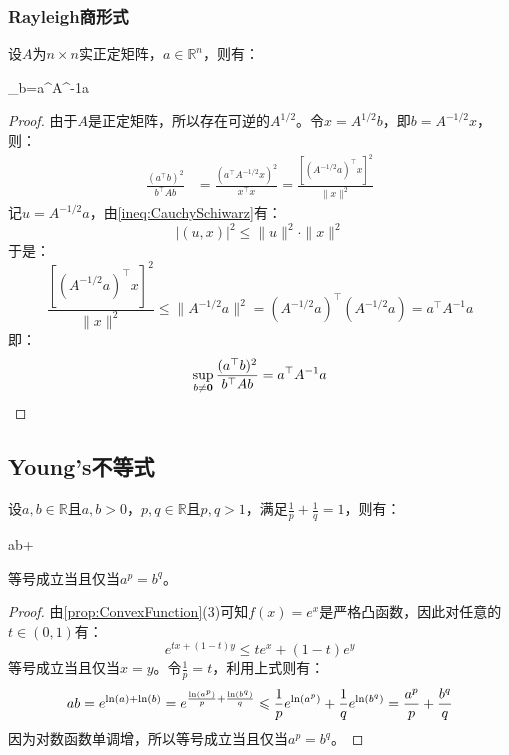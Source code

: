 \subsubsection{Rayleigh商形式}
\begin{theorem}
	设$A$为$n\times n$实正定矩阵，$a\in\mathbb{R}^n$，则有：
	\begin{inequality*}\label{ineq:cauchy-schiwarz-rayleigh}
		\sup_{b\ne{}}=a^{\top}A^{-1}a
	\end{inequality*}
\end{theorem}
\begin{proof}
	由于$A$是正定矩阵，所以存在可逆的$A^{1/2}$。令$x = A^{1/2}b$，即$b = A^{-1/2}x$，则：
	\begin{align*}
		\frac{(a^{\top}b)^2}{b^{\top}Ab} &= \frac{(a^{\top} A^{-1/2} x)^2}{x^{\top} x}=\frac{[(A^{-1/2} a)^{\top} x]^2}{\|x\|^2}
	\end{align*}
	记$u = A^{-1/2}a$，由\cref{ineq:CauchySchiwarz}有：
	\begin{equation*}
		|(u,x)|^2 \leqslant \|u\|^2 \cdot \|x\|^2
	\end{equation*}
	于是：
	\begin{equation*}
		\frac{[(A^{-1/2} a)^{\top} x]^2}{\|x\|^2} \leqslant \|A^{-1/2}a\|^2 = (A^{-1/2}a)^{\top} (A^{-1/2}a) = a^{\top} A^{-1} a
	\end{equation*}
	即：
	\begin{equation*}
		\sup_{b\ne\mathbf{0}}\frac{(a^{\top}b)^2}{b^{\top}Ab}=a^{\top}A^{-1}a \qedhere
	\end{equation*}
\end{proof}

\subsection{Young's不等式}
\begin{theorem}
	设$a,b\in\mathbb{R}$且$a,b>0$，$p,q\in\mathbb{R}$且$p,q>1$，满足$\frac{1}{p}+\frac{1}{q}=1$，则有：
	\begin{inequality*}\label{ineq:young-ineq-Simple}
		ab\leqslant{}+
	\end{inequality*}
	等号成立当且仅当$a^p=b^q$。
\end{theorem}
\begin{proof}
	由\cref{prop:ConvexFunction}(3)可知$f(x)=e^x$是严格凸函数，因此对任意的$t\in(0,1)$有：
	\begin{equation*}
		e^{tx+(1-t)y}\leqslant te^x+(1-t)e^y
	\end{equation*}
	等号成立当且仅当$x=y$。令$\frac{1}{p}=t$，利用上式则有：
	\begin{equation*}
		ab=e^{\ln(a)+\ln(b)}=e^{\frac{\ln(a^p)}{p}+\frac{\ln(b^q)}{q}}\leqslant\frac{1}{p}e^{\ln(a^p)}+\frac{1}{q}e^{\ln(b^q)}=\frac{a^p}{p}+\frac{b^q}{q}\qedhere
	\end{equation*}
	因为对数函数单调增，所以等号成立当且仅当$a^p=b^q$。
\end{proof}

